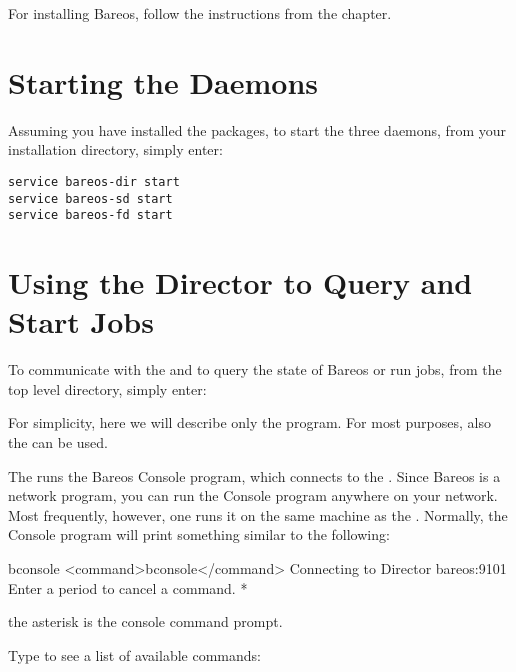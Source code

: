 For installing Bareos, follow the instructions from the  chapter.

\section{Starting the Daemons}
\label{StartDaemon}

Assuming you have installed the packages,
to start the three daemons, from your installation directory, simply enter:

\begin{verbatim}
service bareos-dir start
service bareos-sd start
service bareos-fd start
\end{verbatim}

\section{Using the Director to Query and Start Jobs}

\label{sec:TuturialBconsole}

To communicate with the \bareosDir and to query the state of Bareos or run jobs,
from the top level directory, simply enter:


For simplicity, here we will describe only the  program.
For most purposes, also the  can be used.

The  runs the Bareos Console program, which connects to the
\bareosDir. Since Bareos is a network program, you can run the Console
program anywhere on your network. Most frequently, however, one runs it on the
same machine as the \bareosDir. Normally, the Console program will print
something similar to the following:

\begin{commands}{bconsole}
<command>bconsole</command>
Connecting to Director bareos:9101
Enter a period to cancel a command.
*
\end{commands}

the asterisk is the console command prompt.

Type  to see a list of available commands:

